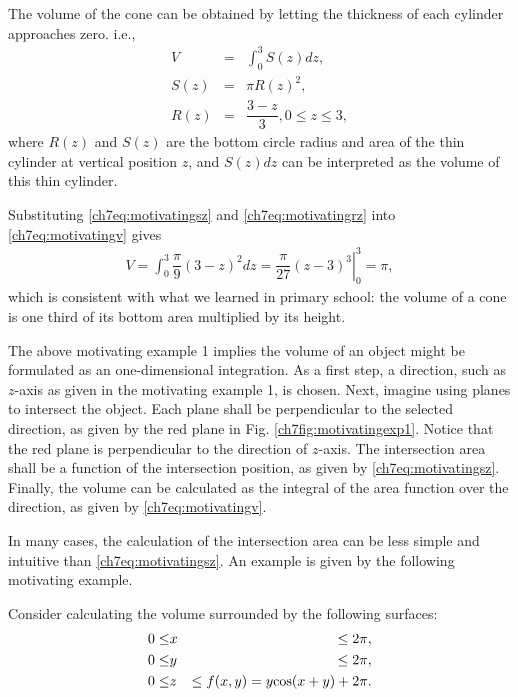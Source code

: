 The volume of the cone can be obtained by letting the thickness of each cylinder approaches zero. i.e.,
\begin{eqnarray}
  V &=& \int_{0}^{3}S(z)dz, \label{ch7eq:motivatingv} \\
  S(z) &=& \pi R(z)^2, \label{ch7eq:motivatingsz} \\
  R(z) &=& \dfrac{3-z}{3}, 0\leq z\leq 3, \label{ch7eq:motivatingrz}
\end{eqnarray}
where $R(z)$ and $S(z)$ are the bottom circle radius and area of the thin cylinder at vertical position $z$, and $S(z)dz$ can be interpreted as the volume of this thin cylinder.

Substituting \eqref{ch7eq:motivatingsz} and \eqref{ch7eq:motivatingrz} into \eqref{ch7eq:motivatingv} gives
\begin{eqnarray}
  V = \int_{0}^{3} \dfrac{\pi}{9} \left(3-z\right)^2 dz
  = \left.\dfrac{\pi}{27}(z-3)^3 \right|_0^3
  = \pi, \nonumber
\end{eqnarray}
which is consistent with what we learned in primary school: the volume of a cone is one third of its bottom area multiplied by its height.

The above motivating example 1 implies the volume of an object might be formulated as an one-dimensional integration. As a first step, a direction, such as $z$-axis as given in the motivating example 1, is chosen. Next, imagine using planes to intersect the object. Each plane shall be perpendicular to the selected direction, as given by the red plane in Fig. \ref{ch7fig:motivatingexp1}. Notice that the red plane is perpendicular to the direction of $z$-axis. The intersection area shall be a function of the intersection position, as given by \eqref{ch7eq:motivatingsz}. Finally, the volume can be calculated as the integral of the area function over the direction, as given by \eqref{ch7eq:motivatingv}.

In many cases, the calculation of the intersection area can be less simple and intuitive than \eqref{ch7eq:motivatingsz}. An example is given by the following motivating example.

\begin{shortbox}
	
	Consider calculating the volume surrounded by the following surfaces:
	\begin{eqnarray}
		0\leq &x& \leq 2\pi, \nonumber \\
		0\leq &y& \leq 2\pi, \nonumber \\
		0\leq &z& \leq f(x,y) = y\textup{cos}(x+y)+2\pi. \label{ch7eq:motivatingexp2f}
	\end{eqnarray}
	
\end{shortbox}

